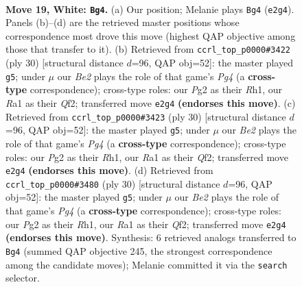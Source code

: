 \documentclass[11pt]{article}
\begin{document}
\clearpage

\begin{figure}[p]\centering
\begin{subfigure}{0.46\textwidth}\centering
\resizebox{\linewidth}{!}{%
\newchessgame
\chessboard[
  setfen={r1b3k1/ppppqpp1/1b1n3p/3P4/8/2N4P/PPPBBPP1/R3Q1K1 w - - 0 19},
  showmover=false,
  pgfstyle=straightmove, color=movearrow, markmove={e2-g4}
]}
\caption{}
\end{subfigure}\hfill
\begin{subfigure}{0.46\textwidth}\centering
\resizebox{\linewidth}{!}{%
\newchessgame
\chessboard[
  setfen={r1b3k1/2q1bppp/p1p2n2/1p2p3/4P1PP/2N1BP1B/PPP2Q2/2K4R w - - 2 16},
  showmover=false,
  pgfstyle=straightmove, color=movearrow, markmove={g4-g5}
]}
\caption{}
\end{subfigure}
\\[4pt]
\begin{subfigure}{0.46\textwidth}\centering
\resizebox{\linewidth}{!}{%
\newchessgame
\chessboard[
  setfen={r1b3k1/2q1bppp/p1p2n2/1p2p3/4P1PP/2N1BP1B/PPP2Q2/2K4R w - - 2 16},
  showmover=false,
  pgfstyle=straightmove, color=movearrow, markmove={g4-g5}
]}
\caption{}
\end{subfigure}\hfill
\begin{subfigure}{0.46\textwidth}\centering
\resizebox{\linewidth}{!}{%
\newchessgame
\chessboard[
  setfen={r1b3k1/2q1bppp/p1p2n2/1p2p3/4P1PP/2N1BP1B/PPP2Q2/2K4R w - - 2 16},
  showmover=false,
  pgfstyle=straightmove, color=movearrow, markmove={g4-g5}
]}
\caption{}
\end{subfigure}
\caption{\textbf{Move 19, White: \texttt{Bg4}.} (a) Our position; Melanie plays \texttt{Bg4} (\texttt{e2g4}). Panels (b)--(d) are the retrieved master positions whose correspondence most drove this move (highest QAP objective among those that transfer to it). (b) Retrieved from \texttt{ccrl\_top\_p0000\#3422} (ply 30) [structural distance $d$=96, QAP obj=52]: the master played \texttt{g5}; under $\mu$ our \emph{Be2} plays the role of that game's \emph{Pg4} (a \textbf{cross-type} correspondence); cross-type roles: our \emph{P}g2 as their \emph{R}h1, our \emph{R}a1 as their \emph{Q}f2; transferred move \texttt{e2g4} \textbf{(endorses this move)}. (c) Retrieved from \texttt{ccrl\_top\_p0000\#3423} (ply 30) [structural distance $d$=96, QAP obj=52]: the master played \texttt{g5}; under $\mu$ our \emph{Be2} plays the role of that game's \emph{Pg4} (a \textbf{cross-type} correspondence); cross-type roles: our \emph{P}g2 as their \emph{R}h1, our \emph{R}a1 as their \emph{Q}f2; transferred move \texttt{e2g4} \textbf{(endorses this move)}. (d) Retrieved from \texttt{ccrl\_top\_p0000\#3480} (ply 30) [structural distance $d$=96, QAP obj=52]: the master played \texttt{g5}; under $\mu$ our \emph{Be2} plays the role of that game's \emph{Pg4} (a \textbf{cross-type} correspondence); cross-type roles: our \emph{P}g2 as their \emph{R}h1, our \emph{R}a1 as their \emph{Q}f2; transferred move \texttt{e2g4} \textbf{(endorses this move)}. Synthesis: 6 retrieved analogs transferred to \texttt{Bg4} (summed QAP objective 245, the strongest correspondence among the candidate moves); Melanie committed it via the \texttt{search} selector.}
\label{fig:thought-m36}
\end{figure}
\end{document}
